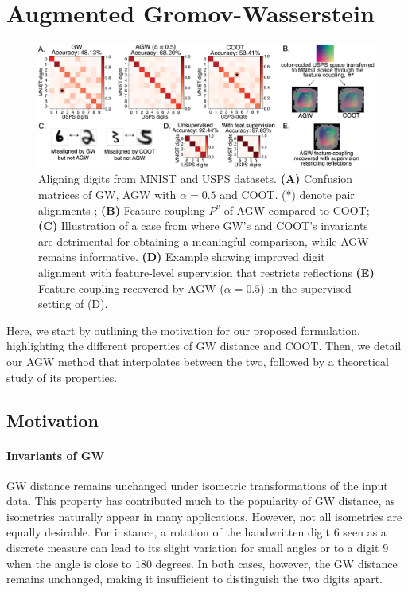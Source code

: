 \section{Augmented Gromov-Wasserstein}

\begin{figure}[t]
\centering
\includegraphics[width=\linewidth]{./Chapitre5/fig//mnist1_supervised.png}
\caption{Aligning digits from MNIST and USPS datasets. \textbf{(A)}
Confusion matrices of GW, AGW with $\alpha=0.5$ and COOT.
(*) denote pair alignments ;
\textbf{(B)} Feature coupling $P^v$ of AGW compared to COOT;
\textbf{(C)} Illustration of a case from where GW's and COOT's invariants are
detrimental for obtaining a meaningful comparison, while AGW remains informative.
\textbf{(D)} Example showing improved digit alignment with feature-level supervision
that restricts reflections \textbf{(E)} Feature coupling recovered by AGW ($\alpha =0.5$)
in the supervised setting of (D).}
\label{fig:mnist}
\end{figure}

Here, we start by outlining the motivation for our proposed formulation,
highlighting the different properties of GW distance and COOT. Then,
we detail our AGW method that interpolates between the two, followed by a
theoretical study of its properties.

\subsection{Motivation}

\paragraph{Invariants of GW} GW distance remains unchanged under isometric transformations of
the input data. This property has contributed much to the popularity of GW distance,
as isometries naturally appear in many applications. However,
not all isometries are equally desirable. For instance, a rotation of the
handwritten digit $6$ seen as a discrete measure can lead to its slight variation
for small angles or to a digit $9$ when the angle is close to $180$ degrees. In both cases,
however, the GW distance remains unchanged, making it insufficient to distinguish
the two digits apart.

